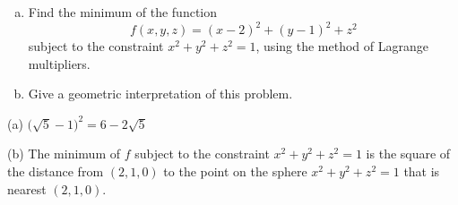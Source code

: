 \begin{question}[M200 2013D] %
\begin{enumerate}[(a)]
\item
Find the minimum of the function
\begin{equation*}
   f(x,y,z) = (x-2)^2 + (y-1)^2 + z^2
\end{equation*}
subject to the constraint $x^2 + y^2 + z^2 = 1$, using the method of 
Lagrange multipliers.
\item
Give a geometric interpretation of this problem.
\end{enumerate}
\end{question}

%

\begin{answer}
(a) $\big(\sqrt{5}-1\big)^2=6-2\sqrt{5}$ 

(b) The minimum of $f$ subject to the constraint
$x^2+y^2+z^2=1$ is the square of the distance from $(2,1,0)$ to 
the point on the sphere $x^2+y^2+z^2=1$ that is nearest $(2,1,0)$.
\end{answer}

